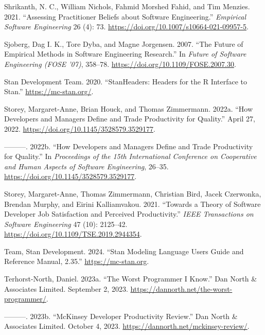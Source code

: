 \documentclass[
]{article}
\newlength{\cslhangindent}
\newenvironment{CSLReferences}[2] %
 {\begin{list}{}{%
  \setlength{\itemindent}{0pt}
  \setlength{\leftmargin}{0pt}
  \setlength{\parsep}{0pt}
  \ifodd #1
   \setlength{\leftmargin}{\cslhangindent}
   \setlength{\itemindent}{-1\cslhangindent}
  \fi
  \setlength{\itemsep}{#2\baselineskip}}}
 {\end{list}}
\begin{document}
\begin{CSLReferences}{1}{0}
Shrikanth, N. C., William Nichols, Fahmid Morshed Fahid, and Tim
Menzies. 2021. {``Assessing Practitioner Beliefs about Software
Engineering.''} \emph{Empirical Software Engineering} 26 (4): 73.
\url{https://doi.org/10.1007/s10664-021-09957-5}.

Sjoberg, Dag I. K., Tore Dyba, and Magne Jorgensen. 2007. {``The
{Future} of {Empirical Methods} in {Software Engineering Research}.''}
In \emph{Future of {Software Engineering} ({FOSE} '07)}, 358--78.
\url{https://doi.org/10.1109/FOSE.2007.30}.

Stan Development Team. 2020. {``{StanHeaders}: {Headers} for the {R}
Interface to {Stan}.''} \url{https://mc-stan.org/}.

Storey, Margaret-Anne, Brian Houck, and Thomas Zimmermann. 2022a. {``How
{Developers} and {Managers Define} and {Trade Productivity} for
{Quality}.''} April 27, 2022.
\url{https://doi.org/10.1145/3528579.3529177}.

---------. 2022b. {``How {Developers} and {Managers Define} and {Trade
Productivity} for {Quality}.''} In \emph{Proceedings of the 15th
{International Conference} on {Cooperative} and {Human Aspects} of
{Software Engineering}}, 26--35.
\url{https://doi.org/10.1145/3528579.3529177}.

Storey, Margaret-Anne, Thomas Zimmermann, Christian Bird, Jacek
Czerwonka, Brendan Murphy, and Eirini Kalliamvakou. 2021. {``Towards a
{Theory} of {Software Developer Job Satisfaction} and {Perceived
Productivity}.''} \emph{IEEE Transactions on Software Engineering} 47
(10): 2125--42. \url{https://doi.org/10.1109/TSE.2019.2944354}.

Team, Stan Development. 2024. {``Stan {Modeling Language Users Guide}
and {Reference Manual}, 2.35.''} \url{https://mc-stan.org}.

Terhorst-North, Daniel. 2023a. {``The {Worst Programmer I Know}.''} Dan
North \& Associates Limited. September 2, 2023.
\url{https://dannorth.net/the-worst-programmer/}.

---------. 2023b. {``{McKinsey Developer Productivity Review}.''} Dan
North \& Associates Limited. October 4, 2023.
\url{https://dannorth.net/mckinsey-review/}.


\end{CSLReferences}
\end{document}
